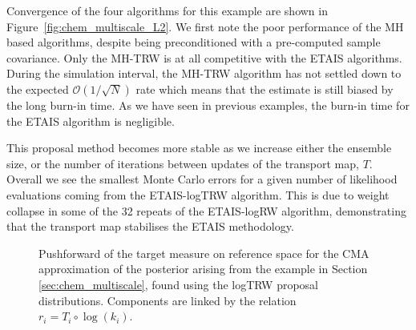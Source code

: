 \documentclass[final]{siamltex}
\newcommand{\edit}[1]{#1}
\begin{document}
\edit{
Convergence of the four algorithms for this example are shown in
Figure~\ref{fig:chem_multiscale_L2}. We first note the poor
performance of the MH based algorithms, despite being preconditioned
with a pre-computed sample covariance. Only the MH-TRW is at all competitive with the ETAIS algorithms. During the simulation interval, the MH-TRW algorithm has not settled down to the expected $\mathcal{O}(1/\sqrt{N})$ rate which means that the estimate is still biased by the long burn-in time. As we have seen in previous examples, the burn-in time for the ETAIS algorithm is negligible.

This proposal method
becomes more stable as we increase either the ensemble size, or the
number of iterations between updates of the transport map,
$T$. Overall we see the smallest Monte Carlo errors for a given number
of likelihood evaluations coming from the ETAIS-logTRW algorithm. This
is due to weight collapse in some of the 32 repeats of the ETAIS-logRW
algorithm, demonstrating that the transport map stabilises the ETAIS methodology.
}

\begin{figure}[!htb]
\centering
\caption{\edit{Pushforward of the target measure on reference space for the CMA
  approximation of the  posterior arising from the example in Section \ref{sec:chem_multiscale}, found using the logTRW proposal distributions. Components are linked by the relation $r_i = T_i\circ\log(k_i)$.}}
\label{fig:chem_reference_spaces}
\end{figure}
\end{document}

